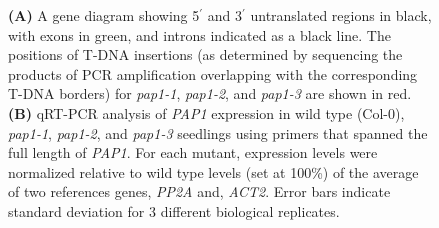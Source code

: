 \begin{figure}[p]
	\centering
	\begingroup
	\let\clearpage\relax
	\endgroup
	{\textbf{(A)} A gene diagram showing 5$^{\prime}$ and 3$^{\prime}$ untranslated regions in black, with exons in green, and introns indicated as a black line. The positions of T-DNA insertions (as determined by sequencing the products of PCR amplification overlapping with the corresponding T-DNA borders) for \textit{pap1-1}, \textit{pap1-2}, and \textit{pap1-3} are shown in red. \textbf{(B)} qRT-PCR analysis of \textit{PAP1} expression in wild type (Col-0), \textit{pap1-1}, \textit{pap1-2}, and \textit{pap1-3} seedlings using primers that spanned the full length of \textit{PAP1}. For each mutant, expression levels were normalized relative to wild type levels (set at 100\%) of the average of two references genes, \textit{PP2A} and, \textit{ACT2}. Error bars indicate standard deviation for 3 different biological replicates.}
	\label{fig:qrtpcr}
\end{figure}

